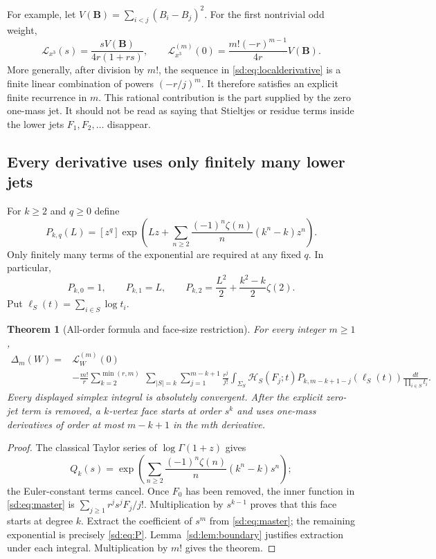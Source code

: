 \documentclass[11pt,a4paper]{article}
\numberwithin{equation}{section}
\newtheorem{theorem}{Theorem}[section]
\theoremstyle{definition}
\theoremstyle{remark}
\begin{document}
For example, let $V(\boldsymbol B)=\sum_{i<j}(B_i-B_j)^2$.  For the
first nontrivial odd weight,
\begin{equation}\label{sd:eq:cubiclocal}
 \mathcal L_{x^3}(s)=\frac{sV(\boldsymbol B)}{4r(1+rs)},\qquad
 \mathcal L_{x^3}^{(m)}(0)
       =\frac{m!(-r)^{m-1}}{4r}V(\boldsymbol B).
\end{equation}
More generally, after division by $m!$, the sequence in
\eqref{sd:eq:localderivative} is a finite linear combination of powers
$(-r/j)^m$.  It therefore satisfies an explicit finite recurrence in
$m$.  This rational contribution is the part supplied by the zero
one-mass jet.  It should not be read as saying that Stieltjes or residue
terms inside the lower jets $F_1,F_2,\ldots$ disappear.

\subsection{Every derivative uses only finitely many lower jets}
\label{sd:subsec:allorders}

For $k\ge2$ and $q\ge0$ define
\begin{equation}\label{sd:eq:P}
 P_{k,q}(L)=[z^q]\exp\left(
 Lz+\sum_{n\ge2}\frac{(-1)^n\zeta(n)}n(k^n-k)z^n\right).
\end{equation}
Only finitely many terms of the exponential are required at any fixed
$q$.  In particular,
\[
 P_{k,0}=1,\qquad P_{k,1}=L,\qquad
 P_{k,2}=\frac{L^2}{2}+\frac{k^2-k}{2}\zeta(2).
\]
Put $\ell_S(t)=\sum_{i\in S}\log t_i$.

\begin{theorem}[All-order formula and face-size restriction]
\label{sd:thm:allorders}
For every integer $m\ge1$,
\begin{equation}\label{sd:eq:allorders}
 \boxed{\begin{aligned}
 \Delta_m(W)={}&\mathcal L_W^{(m)}(0)\\
 &-\frac{m!}{r}
  \sum_{k=2}^{\min(r,m)}\ \sum_{|S|=k}
  \sum_{j=1}^{m-k+1}\frac{r^j}{j!}
   \int_{\Sigma_S}\mathcal H_S(F_j;t)
       P_{k,m-k+1-j}(\ell_S(t))
                     \frac{dt}{\prod_{i\in S}t_i}.
 \end{aligned}}
\end{equation}
Every displayed simplex integral is absolutely convergent.  After the
explicit zero-jet term is removed, a $k$-vertex face starts at order
$s^k$ and uses one-mass derivatives of order at most $m-k+1$ in the
$m$th derivative.
\end{theorem}
\begin{proof}
The classical Taylor series of $\log\Gamma(1+z)$ gives
\[
 Q_k(s)=\exp\left(
       \sum_{n\ge2}\frac{(-1)^n\zeta(n)}n(k^n-k)s^n\right);
\]
the Euler-constant terms cancel.  Once $F_0$ has been removed, the
inner function in \eqref{sd:eq:master} is
$\sum_{j\ge1}r^js^jF_j/j!$.  Multiplication by $s^{k-1}$ proves
that this face starts at degree $k$.  Extract the coefficient of $s^m$
from \eqref{sd:eq:master}; the remaining exponential is precisely
\eqref{sd:eq:P}.  Lemma~\ref{sd:lem:boundary} justifies extraction under
each integral.  Multiplication by $m!$ gives the theorem.
\end{proof}
\end{document}
